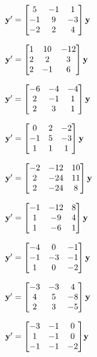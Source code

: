 \begin{exerciselistTwoColumn}
\item\label{exer:10.5.24}$\mathbf{y}'=\begin{bmatrix}5&-1&1\\-1&9&-3\\-2&2&4\end{bmatrix}\mathbf{y}$
\item\label{exer:10.5.25}$\mathbf{y}'=\begin{bmatrix}1&10&-12\\2&2&3\\2&-1&6\end{bmatrix}\mathbf{y}$
\item\label{exer:10.5.26}$\mathbf{y}'=\begin{bmatrix}-6&-4&-4\\2&-1&1\\2&3&1\end{bmatrix}\mathbf{y}$
\item\label{exer:10.5.27}$\mathbf{y}'=\begin{bmatrix}0&2&-2\\-1&5&-3\\1&1&1\end{bmatrix}\mathbf{y}$
\item\label{exer:10.5.28}$\mathbf{y}'=\begin{bmatrix}-2&-12&10\\2&-24&11\\2&-24&8\end{bmatrix}\mathbf{y}$
\item\label{exer:10.5.29}$\mathbf{y}'=\begin{bmatrix}-1&-12&8\\1&-9&4\\1&-6&1\end{bmatrix}\mathbf{y}$
\item\label{exer:10.5.30}$\mathbf{y}'=\begin{bmatrix}-4&0&-1\\-1&-3&-1\\1&0&-2\end{bmatrix}\mathbf{y}$
\item\label{exer:10.5.31}$\mathbf{y}'=\begin{bmatrix}-3&-3&4\\4&5&-8\\2&3&-5\end{bmatrix}\mathbf{y}$
\item\label{exer:10.5.32}$\mathbf{y}'={\begin{bmatrix}-3&-1&0\\1&-1&0\\-1&-1&-2\end{bmatrix}}\mathbf{y}$
\end{exerciselistTwoColumn}
